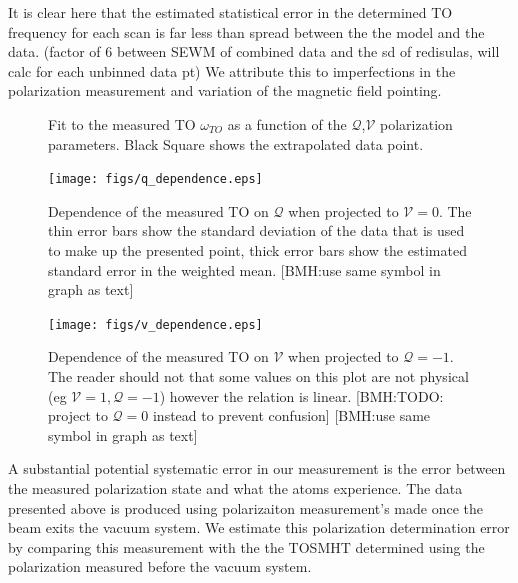 \documentclass[aps,prl,
,reprint,
superscriptaddress,
onecolumn,
showpacs,preprintnumbers,
 amsmath,amssymb,
]{revtex4-1}
\newcommand{\brycecom}[1]{{\color{ProcessBlue}[BMH:{#1}]\normalcolor}} %
\begin{document}
It is clear here that the estimated statistical error in the determined TO frequency for each scan is far less than spread between the the model and the data. (factor of 6 between SEWM of combined data and the sd of redisulas, will calc for each unbinned data pt) We attribute this to imperfections in the polarization measurement and variation of the magnetic field pointing.

\newcommand{\subfigwidth}{0.3\linewidth}

\begin{figure}
    \centering
\caption{ Fit to the measured TO $\omega_{TO}$ as a function of the  $\mathcal{Q}$,$\mathcal{V}$ polarization parameters. Black Square shows the extrapolated data point. }
\end{figure}

\begin{figure}[h!]
\centering
\texttt{[image: figs/q\_dependence.eps]}
\caption{ 
Dependence of the measured TO on $\mathcal{Q}$ when projected to  $\mathcal{V}=0$. The thin error bars show the standard deviation of the data that is used to make up the presented point, thick error bars show the estimated standard error in the weighted mean. \brycecom{use same symbol in graph as text}
}
\end{figure}

\begin{figure}[h!]
\centering
\texttt{[image: figs/v\_dependence.eps]}
\caption{Dependence of the measured TO on $\mathcal{V}$ when projected to  $\mathcal{Q}=-1$. The reader should not that some values on this plot are not physical (eg  $\mathcal{V}=1,\mathcal{Q}=-1$) however the relation is linear. \brycecom{TODO: project to $\mathcal{Q}=0$ instead to prevent confusion} \brycecom{use same symbol in graph as text}
}
\end{figure}



A substantial potential systematic error in our measurement is the error between the measured polarization state and what the atoms experience. The data presented above is produced using polarizaiton measurement's made once the beam exits the vacuum system. We estimate this polarization determination error by comparing this measurement with the the TOSMHT determined using the polarization measured before the vacuum system. 
\end{document}
